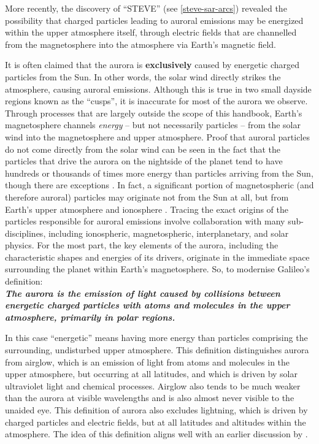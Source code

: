 \documentclass{article}
\renewcommand{\cite}[1]{\parencite{#1}}
\begin{document}
More recently, the discovery of ``STEVE'' (see \ref{steve-sar-arcs}) \cite{MacDonald2018} revealed the possibility that charged particles leading to auroral emissions may be energized within the upper atmosphere itself, through electric fields that are channelled from the magnetosphere into the atmosphere via Earth's magnetic field.

It is often claimed that the aurora is \textbf{exclusively} caused by energetic charged particles from the Sun. In other words, the solar wind directly strikes the atmosphere, causing auroral emissions. Although this is true in two small dayside regions known as the ``cusps'',  it is inaccurate for most of the aurora we observe. Through processes that are largely outside the scope of this handbook, Earth's magnetosphere channels {\it energy} -- but not necessarily particles -- from the solar wind into the magnetosphere and upper atmosphere.   
Proof that auroral particles do not come directly from the solar wind can be seen in the fact that the particles that drive the aurora on the nightside of the planet tend to have hundreds or thousands of times more energy than particles arriving from the Sun, though there are exceptions \cite{Hosokawa2024}. In fact, a significant portion of magnetospheric (and therefore auroral) particles may originate not from the Sun at all, but from Earth's upper atmosphere and ionosphere \cite{Chappell1987}. Tracing the exact origins of the particles responsible for auroral emissions involve collaboration with many sub-disciplines, including ionospheric, magnetospheric, interplanetary, and solar physics. For the most part, the key elements of the aurora, including the characteristic shapes and energies of its drivers, originate in the immediate space surrounding the planet within Earth's magnetosphere. 
So, to modernise Galileo's definition: \\
\newline
\textbf{\textit{The aurora is the emission of light caused by collisions between energetic charged particles with atoms and molecules in the upper atmosphere, primarily in polar regions.}}   %
\newline

In this case ``energetic'' means having more energy than particles comprising the surrounding, undisturbed upper atmosphere. This definition distinguishes aurora from airglow, which is an emission of light from atoms and molecules in the upper atmosphere, but occurring at all latitudes, and which is driven by solar ultraviolet light and chemical processes. Airglow also tends to be much weaker than the aurora at visible wavelengths and is also almost never visible to the unaided eye. This definition of aurora also excludes lightning, which is driven by charged particles and electric fields, but at all latitudes and altitudes within the atmosphere. The idea of this definition aligns well with an earlier discussion by \textcite{clarke2004}.
\end{document}
